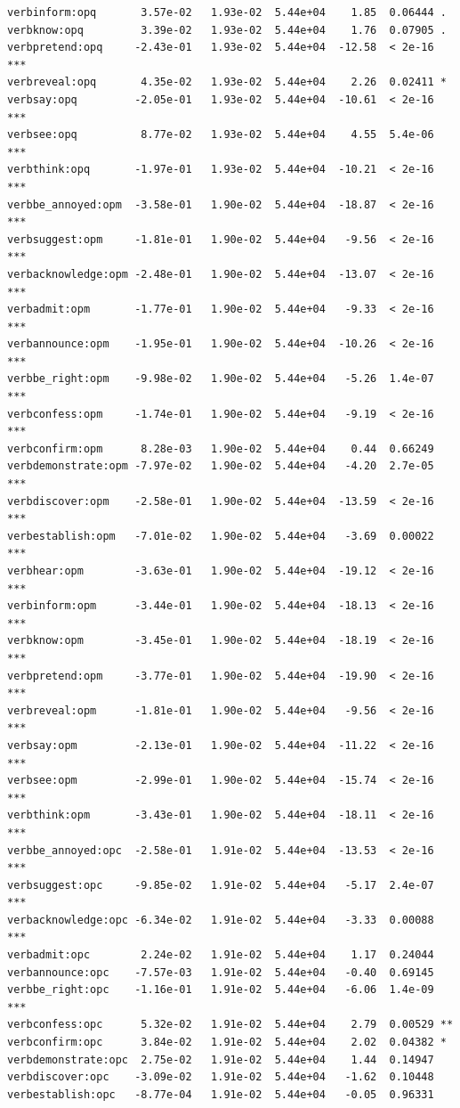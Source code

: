 \documentclass[10pt]{article}\usepackage[]{graphicx}\usepackage[dvipsnames]{xcolor}
\makeatletter
\newenvironment{kframe}{%
 \def\at@end@of@kframe{}%
 \ifinner\ifhmode%
  \def\at@end@of@kframe{\end{minipage}}%
  \begin{minipage}{\columnwidth}%
 \fi\fi%
 \def\FrameCommand##1{\hskip\@totalleftmargin \hskip-\fboxsep
 \colorbox{shadecolor}{##1}\hskip-\fboxsep
     \hskip-\linewidth \hskip-\@totalleftmargin \hskip\columnwidth}%
 \MakeFramed {\advance\hsize-\width
   \@totalleftmargin\z@ \linewidth\hsize
   \@setminipage}}%
 {\par\unskip\endMakeFramed%
 \at@end@of@kframe}
\newenvironment{knitrout}{}{} %
\makeatother
\begin{document}
\begin{knitrout}
\begin{kframe}
\begin{verbatim}
verbinform:opq       3.57e-02   1.93e-02  5.44e+04    1.85  0.06444 .  
verbknow:opq         3.39e-02   1.93e-02  5.44e+04    1.76  0.07905 .  
verbpretend:opq     -2.43e-01   1.93e-02  5.44e+04  -12.58  < 2e-16 ***
verbreveal:opq       4.35e-02   1.93e-02  5.44e+04    2.26  0.02411 *  
verbsay:opq         -2.05e-01   1.93e-02  5.44e+04  -10.61  < 2e-16 ***
verbsee:opq          8.77e-02   1.93e-02  5.44e+04    4.55  5.4e-06 ***
verbthink:opq       -1.97e-01   1.93e-02  5.44e+04  -10.21  < 2e-16 ***
verbbe_annoyed:opm  -3.58e-01   1.90e-02  5.44e+04  -18.87  < 2e-16 ***
verbsuggest:opm     -1.81e-01   1.90e-02  5.44e+04   -9.56  < 2e-16 ***
verbacknowledge:opm -2.48e-01   1.90e-02  5.44e+04  -13.07  < 2e-16 ***
verbadmit:opm       -1.77e-01   1.90e-02  5.44e+04   -9.33  < 2e-16 ***
verbannounce:opm    -1.95e-01   1.90e-02  5.44e+04  -10.26  < 2e-16 ***
verbbe_right:opm    -9.98e-02   1.90e-02  5.44e+04   -5.26  1.4e-07 ***
verbconfess:opm     -1.74e-01   1.90e-02  5.44e+04   -9.19  < 2e-16 ***
verbconfirm:opm      8.28e-03   1.90e-02  5.44e+04    0.44  0.66249    
verbdemonstrate:opm -7.97e-02   1.90e-02  5.44e+04   -4.20  2.7e-05 ***
verbdiscover:opm    -2.58e-01   1.90e-02  5.44e+04  -13.59  < 2e-16 ***
verbestablish:opm   -7.01e-02   1.90e-02  5.44e+04   -3.69  0.00022 ***
verbhear:opm        -3.63e-01   1.90e-02  5.44e+04  -19.12  < 2e-16 ***
verbinform:opm      -3.44e-01   1.90e-02  5.44e+04  -18.13  < 2e-16 ***
verbknow:opm        -3.45e-01   1.90e-02  5.44e+04  -18.19  < 2e-16 ***
verbpretend:opm     -3.77e-01   1.90e-02  5.44e+04  -19.90  < 2e-16 ***
verbreveal:opm      -1.81e-01   1.90e-02  5.44e+04   -9.56  < 2e-16 ***
verbsay:opm         -2.13e-01   1.90e-02  5.44e+04  -11.22  < 2e-16 ***
verbsee:opm         -2.99e-01   1.90e-02  5.44e+04  -15.74  < 2e-16 ***
verbthink:opm       -3.43e-01   1.90e-02  5.44e+04  -18.11  < 2e-16 ***
verbbe_annoyed:opc  -2.58e-01   1.91e-02  5.44e+04  -13.53  < 2e-16 ***
verbsuggest:opc     -9.85e-02   1.91e-02  5.44e+04   -5.17  2.4e-07 ***
verbacknowledge:opc -6.34e-02   1.91e-02  5.44e+04   -3.33  0.00088 ***
verbadmit:opc        2.24e-02   1.91e-02  5.44e+04    1.17  0.24044    
verbannounce:opc    -7.57e-03   1.91e-02  5.44e+04   -0.40  0.69145    
verbbe_right:opc    -1.16e-01   1.91e-02  5.44e+04   -6.06  1.4e-09 ***
verbconfess:opc      5.32e-02   1.91e-02  5.44e+04    2.79  0.00529 ** 
verbconfirm:opc      3.84e-02   1.91e-02  5.44e+04    2.02  0.04382 *  
verbdemonstrate:opc  2.75e-02   1.91e-02  5.44e+04    1.44  0.14947    
verbdiscover:opc    -3.09e-02   1.91e-02  5.44e+04   -1.62  0.10448    
verbestablish:opc   -8.77e-04   1.91e-02  5.44e+04   -0.05  0.96331    

\end{verbatim}
\end{kframe}
\end{knitrout}
\end{document}

